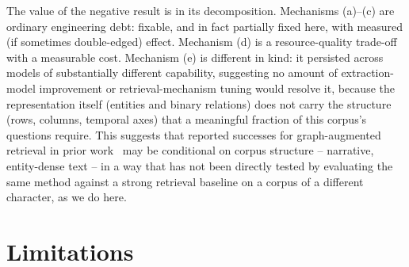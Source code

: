 \documentclass[sigconf,anonymous,review]{acmart}
\begin{document}
The value of the negative result is in its decomposition. Mechanisms (a)--(c) are ordinary engineering debt: fixable, and in fact partially fixed here, with measured (if sometimes double-edged) effect. Mechanism (d) is a resource-quality trade-off with a measurable cost. Mechanism (e) is different in kind: it persisted across models of substantially different capability, suggesting no amount of extraction-model improvement or retrieval-mechanism tuning would resolve it, because the representation itself (entities and binary relations) does not carry the structure (rows, columns, temporal axes) that a meaningful fraction of this corpus's questions require. This suggests that reported successes for graph-augmented retrieval in prior work~\cite{edge2024graphrag,gutierrez2024hipporag} may be conditional on corpus structure -- narrative, entity-dense text -- in a way that has not been directly tested by evaluating the same method against a strong retrieval baseline on a corpus of a different character, as we do here.

\section{Limitations}
\label{sec:limitations}
\end{document}
